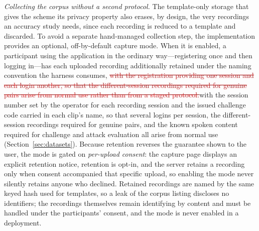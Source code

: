 \documentclass[10pt,journal,compsoc]{IEEEtran}
\begin{document}
{\emph{Collecting the corpus without a second protocol.} The template-only storage that gives the scheme its privacy property also erases, by design, the very recordings an accuracy study needs, since each recording is reduced to a template and discarded. To avoid a separate hand-managed collection step, the implementation provides an optional, off-by-default capture mode. When it is enabled, a participant using the application in the ordinary way---registering once and then logging in---has each uploaded recording additionally retained under the naming convention the harness consumes, \textcolor{red}{\sout{with the registration providing one session and each login another, so that the different-session recordings required for genuine pairs arise from normal use rather than from a staged protocol.}}\textcolor{revpink}{with the session number set by the operator for each recording session and the issued challenge code carried in each clip's name, so that several logins per session, the different-session recordings required for genuine pairs, and the known spoken content required for challenge and attack evaluation all arise from normal use (Section~\ref{sec:datasets}).} Because retention reverses the guarantee shown to the user, the mode is gated on \emph{per-upload consent}: the capture page displays an explicit retention notice, retention is opt-in, and the server retains a recording only when consent accompanied that specific upload, so enabling the mode never silently retains anyone who declined. Retained recordings are named by the same keyed hash used for templates, so a leak of the corpus listing discloses no identifiers; the recordings themselves remain identifying by content and must be handled under the participants' consent, and the mode is never enabled in a deployment.

}
\end{document}

